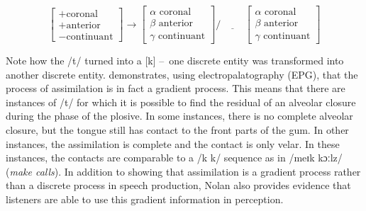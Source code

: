 \begin{equation}
\begin{bmatrix} 
+\text{coronal}\\
+\text{anterior}\\
-\text{continuant}
\end{bmatrix} 
\rightarrow
\begin{bmatrix} 
\alpha \,\, \text{coronal}\\
\beta \,\, \text{anterior}\\
\gamma \,\, \text{continuant}
\end{bmatrix}
/\underline{\hspace{1cm}}
\begin{bmatrix} 
\alpha \,\, \text{coronal}\\
\beta \,\, \text{anterior}\\
\gamma \,\, \text{continuant}
\end{bmatrix}
\label{eq:assimilation_rule}
\end{equation}

Note how the /t/ turned into a [k] – one discrete entity was transformed into another discrete entity. \citet{Nolan1992} demonstrates, using electropalatography (EPG), that the process of assimilation is in fact a gradient process. This means that there are instances of /t/ for which it is possible to find the residual of an alveolar closure during the phase of the plosive. In some instances, there is no complete alveolar closure, but the tongue still has contact to the front parts of the gum. In other instances, the assimilation is complete and the contact is only velar. In these instances, the contacts are comparable to a /k k/ sequence as in /meɪk kɔːlz/ (\emph{make calls}). In addition to showing that assimilation is a gradient process rather than a discrete process in speech production, Nolan also provides evidence that listeners are able to use this gradient information in perception.

